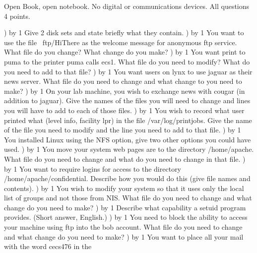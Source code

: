 
\parindent=0in
\nopagenumbers
\newcount\quesno
{}
\def\ques{\number\quesno) \advance\quesno by 1}
\def\aspace{\vskip 1.5in}

Open Book, open notebook. No digital or communications devices.
All questions 4 points.

\ques
Give 2 disk sets and state briefly what they contain.
\vskip 1.0in
\ques
You want to use the file {\ltt{}~ftp/HiThere} as the
welcome message for anonymous ftp service.
What file do you change? What change do you make?
\vskip 1.0in
\ques
You want print to {\ltt{}puma} to the printer puma calls {\ltt{}ecs1}.
What file do you need to modify?
What do you need to add to that file?
\vskip 1.2in
\ques
You want users on {\ltt{}lynx} to use {\ltt{}jaguar} as their news server.
What file do you need to change and what change to you need to make?
\vskip 1.0in
\ques
On your lab machine, you wish to exchange news with {\ltt{}cougar}
(in addition to {\ltt{}jaguar}).
Give the names of the files you will need to change and lines you
will have to add to each of those files.
\vskip 2.2in
\vfill\eject
\ques
You wish to record what user printed what
(level {\ltt{}info}, facility {\ltt{}lpr}) in
the file {\ltt{}/var/log/printjobs}.
Give the name of the file you need to modify and the line you need to
add to that file.
\vskip 0.8in
\ques
You installed Linux using the NFS option, give two other options
you could have used.
\vskip 0.8in
\ques
You move your system web pages are to the directory {\ltt{}/home/apache}.
What file do you need to change and what do you need to change in that file.
\vskip 1.0in
\ques
You want to require logins for access to the directory
{\ltt{}/home/apache/confidential}.
Describe how you would do this (give file names and contents).
\vskip 2.8in
\vfill\eject
\ques
You wish to modify your system so that it uses only the local list of
groups and not those from NIS.
What file do you need to change and what change do you need to make?
\vskip 0.8in
\ques
Describe what capability a setuid program provides. (Short answer, English.)
\vskip 2.0in
\ques
You need to block the ability to access your machine using ftp into the
{\ltt{}bob} account.
What file do you need to change and what change do you need to make?
\vskip 0.8in
\ques
You want to place all your mail with the word {\ltt{}cecs476} in the
